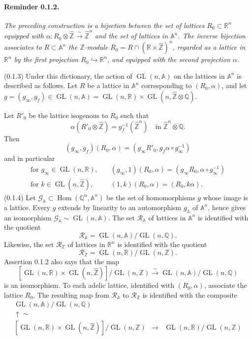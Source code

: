 \documentclass[10pt,a4paper]{article}
\providecommand{\GL}{\operatorname{GL}}
\providecommand{\Hom}{\operatorname{Hom}}
\providecommand{\R}{\mathbb R}
\providecommand{\Q}{\mathbb Q}
\providecommand{\Z}{\mathbb Z}
\providecommand{\A}{\mathbb A}
\providecommand{\calR}{\mathcal R}
\begin{document}
\paragraph{Reminder 0.1.2.}{\itshape  The preceding construction is a bijection between the set of lattices $R_0\subset\R^n$ equipped with $\alpha:R_0\otimes\widehat{\Z}\xrightarrow{\sim}\widehat{\Z}^{n}$ and the set of lattices in $\A^n$. The inverse bijection associates to $R\subset\A^n$ the $\Z$-module $R_0=R\cap(\R\times\widehat{\Z})^n$, regarded as a lattice in $\R^n$ by the first projection $R_0\hookrightarrow\R^n$, and equipped with the second projection $\alpha$.\par}

\clearpage
{}
\hypertarget{authority-6}{}
(0.1.3) Under this dictionary, the action of $\GL(n,\A)$ on the lattices in $\A^n$ is described as follows. Let $R$ be a lattice in $\A^n$ corresponding to $(R_0,\alpha)$, and let $g=(g_\infty,g_f)\in\GL(n,\A)=\GL(n,\R)\times\GL(n,\widehat{\Z}\otimes\Q)$.

Let $R'_0$ be the lattice isogenous to $R_0$ such that
\[
\alpha(R'_0\otimes\widehat{\Z})=g_f^{-1}(\widehat{\Z}^{n})\quad\text{in }\widehat{\Z}^{n}\otimes\Q.
\]
Then
\[
(g_\infty,g_f)(R_0,\alpha)=(g_\infty R'_0,g_f\alpha\circ g_\infty^{-1})
\]
and in particular
\[
\begin{aligned}
\text{for }g_\infty\in\GL(n,\R),\quad &(g_\infty,1)(R_0,\alpha)=(g_\infty R_0,\alpha\circ g_\infty^{-1})\\
\text{for }k\in\GL(n,\widehat{\Z}),\quad &(1,k)(R_0,\alpha)=(R_0,k\alpha).
\end{aligned}
\]
(0.1.4) Let $\mathcal G_{\A}\subset\Hom(\Q^n,\A^n)$ be the set of homomorphisms $g$ whose image is a lattice. Every $g$ extends by linearity to an automorphism $g_{\A}$ of $\A^n$, hence gives an isomorphism $\mathcal G_{\A}\sim\GL(n,\A)$. The set $\calR_{\A}$ of lattices in $\A^n$ is identified with the quotient
\[
\calR_{\A}=\GL(n,\A)/\GL(n,\Q).
\]
Likewise, the set $\calR_{\Z}$ of lattices in $\R^n$ is identified with the quotient
\[
\calR_{\Z}=\GL(n,\R)/\GL(n,\Z).
\]
Assertion 0.1.2 also says that the map
\[
\tag{0.1.4.1}
[\GL(n,\R)\times\GL(n,\widehat{\Z})]/\GL(n,\Z)\xrightarrow{\sim}\GL(n,\A)/\GL(n,\Q)
\]
is an isomorphism. To each adelic lattice, identified with $(R_0,\alpha)$, associate the lattice $R_0$. The resulting map from $\calR_{\A}$ to $\calR_{\Z}$ is identified with the composite
\[
\begin{array}{ccc}
\GL(n,\A)/\GL(n,\Q)&&\\
\uparrow\scriptstyle\sim&&\\
{}[\GL(n,\R)\times\GL(n,\widehat{\Z})]/\GL(n,\Z)&\longrightarrow&\GL(n,\R)/\GL(n,\Z)
\end{array}
\]
\end{document}
